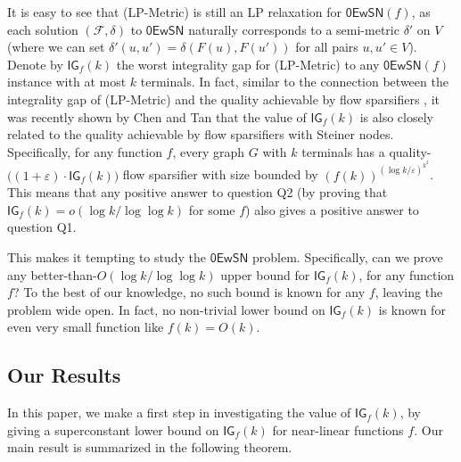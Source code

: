 \documentclass[11pt]{article}
\theoremstyle{definition}
\newcommand{\fset}{{\mathcal{F}}}
\newcommand{\eps}{{\varepsilon}}
\newcounter{note}
\newcommand{\zesn}{\mathsf{0EwSN}}
\begin{document}
It is easy to see that (\textsf{LP-Metric}) is still an LP relaxation for $\zesn(f)$, as each solution $(\fset,\delta)$ to $\zesn$ naturally corresponds to a semi-metric $\delta'$ on $V$ (where we can set $\delta'(u,u')=\delta(F(u),F(u'))$ for all pairs $u,u'\in V$). 
Denote by $\textsf{IG}_f(k)$ the worst integrality gap for (\textsf{LP-Metric}) to any $\zesn(f)$ instance with at most $k$ terminals.
In fact, similar to the connection between the integrality gap of (\textsf{LP-Metric}) and the quality achievable by flow sparsifiers \cite{moitra2009approximation,leighton2010extensions},
it was recently shown by Chen and Tan \cite{chen20241+} that the value of $\textsf{IG}_f(k)$ is also closely related to the quality achievable by flow sparsifiers with Steiner nodes.
Specifically, for any function $f$, every graph $G$ with $k$ terminals has a quality-$\big((1+\eps)\cdot \textsf{IG}_f(k)\big)$ flow sparsifier with size bounded by $(f(k))^{(\log k/\eps)^{k^2}}$. 
This means that any positive answer to question Q2 (by proving that $\textsf{IG}_f(k)=o(\log k/\log\log k)$ for some $f$) also gives a positive answer to question Q1.

This makes it tempting to study the $\zesn$ problem. Specifically, can we prove any better-than-$O(\log k/\log\log k)$ upper bound for $\textsf{IG}_f(k)$, for any function $f$?
To the best of our knowledge, no such bound is known for any $f$, leaving the problem wide open. 
In fact, no non-trivial lower bound on $\textsf{IG}_f(k)$ is known for even very small function like $f(k)=O(k)$.


\subsection{Our Results}

In this paper, we make a first step in investigating the value of  $\textsf{IG}_f(k)$, by giving a superconstant lower bound on $\textsf{IG}_f(k)$ for near-linear functions $f$.
Our main result is summarized in the following theorem.
\end{document}

